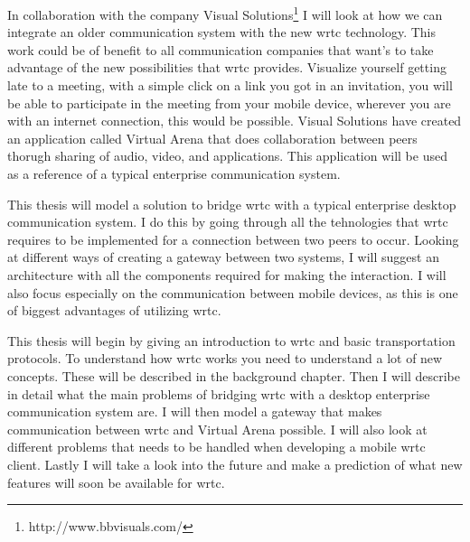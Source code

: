 In collaboration with the company Visual Solutions\footnote{http://www.bbvisuals.com/} I will look at how we can integrate an older communication system with the new \gls{wrtc} technology. This work could be of benefit to all communication companies that want's to take advantage of the new possibilities that \gls{wrtc} provides. Visualize yourself getting late to a meeting, with a simple click on a link you got in an invitation, you will be able to participate in the meeting from your mobile device, wherever you are with an internet connection, this would be possible. Visual Solutions have created an application called Virtual Arena that does collaboration between peers thorugh sharing of audio, video, and applications. This application will be used as a reference of a typical enterprise communication system.

This thesis will model a solution to bridge \gls{wrtc} with a typical enterprise desktop communication system. I do this by going through all the tehnologies that \gls{wrtc} requires to be implemented for a connection between two peers to occur. Looking at different ways of creating a gateway between two systems, I will suggest an architecture with all the components required for making the interaction. I will also focus especially on the communication between mobile devices, as this is one of biggest advantages of utilizing \gls{wrtc}.

This thesis will begin by giving an introduction to \gls{wrtc} and basic transportation protocols. To understand how \gls{wrtc} works you need to understand a lot of new concepts. These will be described in the background chapter. Then I will describe in detail what the main problems of bridging \gls{wrtc} with a desktop enterprise communication system are. I will then model a gateway that makes communication between \gls{wrtc} and Virtual Arena possible. I will also look at different problems that needs to be handled when developing a mobile \gls{wrtc} client. Lastly I will take a look into the future and make a prediction of what new features will soon be available for \gls{wrtc}.